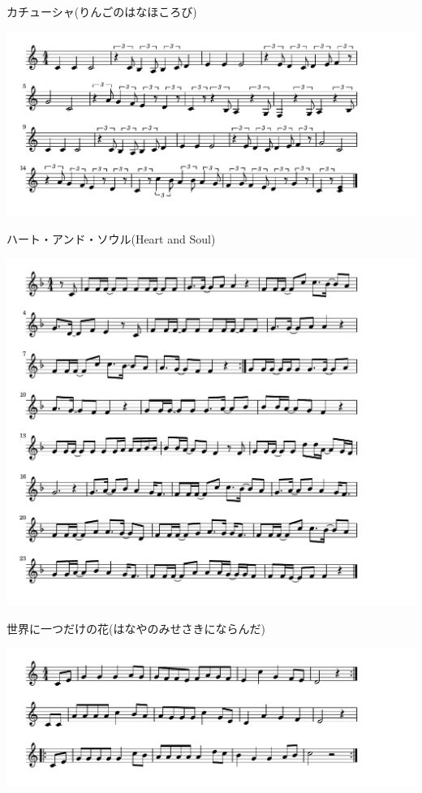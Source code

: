 \documentclass[a4paper]{ltjsarticle}
\begin{document}
\vspace{-10mm} \hspace{10mm}
カチューシャ(りんごのはなほころび)

\includegraphics[clip]{heartandsoul_crop.pdf}

\vspace{-10mm} \hspace{10mm}
ハート・アンド・ソウル(Heart and Soul)

\includegraphics[clip]{sekainihitotsu_crop.pdf}

\vspace{-10mm} \hspace{10mm}
世界に一つだけの花(はなやのみせさきにならんだ)

\includegraphics[clip]{kokyowohanaruru_crop.pdf}
\end{document}
